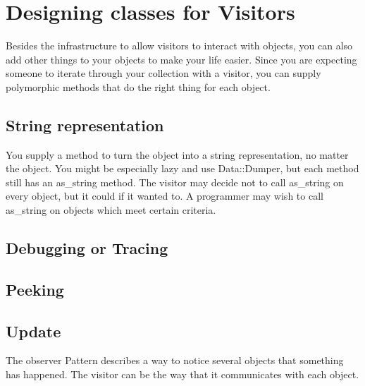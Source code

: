 	\section{Designing classes for Visitors}
	
Besides the infrastructure to allow visitors to interact
with objects, you can also add other things to your objects
to make your life easier.  Since you are expecting someone
to iterate through your collection with a visitor, you can
supply polymorphic methods that do the right thing for each
object.


		\subsection{String representation}
		
You supply a method to turn the object into a string
representation, no matter the object.  You might be
especially lazy and use Data::Dumper, but each method still
has an as\_string method.  The visitor may decide not to
call as\_string on every object, but it could if it wanted
to. A programmer may wish to call as\_string on objects
which meet certain criteria.
		
		\subsection{Debugging or Tracing}
		
		
		\subsection{Peeking}
		
		
		\subsection{Update}
		
The observer Pattern describes a way to notice several
objects that something has happened. The visitor can be the
way that it communicates with each object.
	
